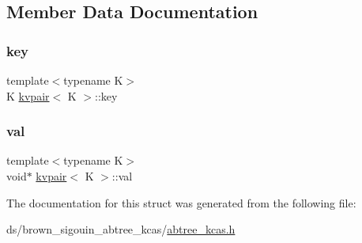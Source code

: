 \subsection{Member Data Documentation}
\mbox{\label{structkvpair_a3898166444fc841d48279077e0bbe1ff}} 
\subsubsection{\texorpdfstring{key}{key}}
{\footnotesize\ttfamily template$<$typename K$>$ \\
K \hyperlink{structkvpair}{kvpair}$<$ K $>$\+::key}

\mbox{\label{structkvpair_a31a1426532d867ca319a0fa40281bd9c}} 
\subsubsection{\texorpdfstring{val}{val}}
{\footnotesize\ttfamily template$<$typename K$>$ \\
void$\ast$ \hyperlink{structkvpair}{kvpair}$<$ K $>$\+::val}



The documentation for this struct was generated from the following file\+:\begin{DoxyCompactItemize}
\item 
ds/brown\+\_\+sigouin\+\_\+abtree\+\_\+kcas/\hyperlink{abtree__kcas_8h}{abtree\+\_\+kcas.\+h}\end{DoxyCompactItemize}

